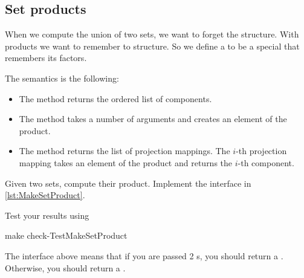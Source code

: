 \subsection{Set products}

When we compute the union of two sets, we want to forget the structure. With products we want to remember to structure.
So we define a  to be a special \Setoid that remembers its factors.



The semantics is the following:
\begin{itemize}
  \item The method  returns the ordered list of components.
  \item The method  takes a number of arguments and creates an element of the product.
  \item The method  returns the list of projection mappings.
  The $i$-th projection mapping takes an element of the product and returns the $i$-th component.

\end{itemize}


\begin{codeexercise}
  Given two sets, compute their product. Implement the interface in \cref{lst:MakeSetProduct}.

  Test your results using

  \begin{console}
    make check-TestMakeSetProduct
  \end{console}

\end{codeexercise}



The interface above means that if you are passed 2 \FiniteSet{}s, you should return a \FiniteSet.
Otherwise, you should return a \Setoid.



%

%

